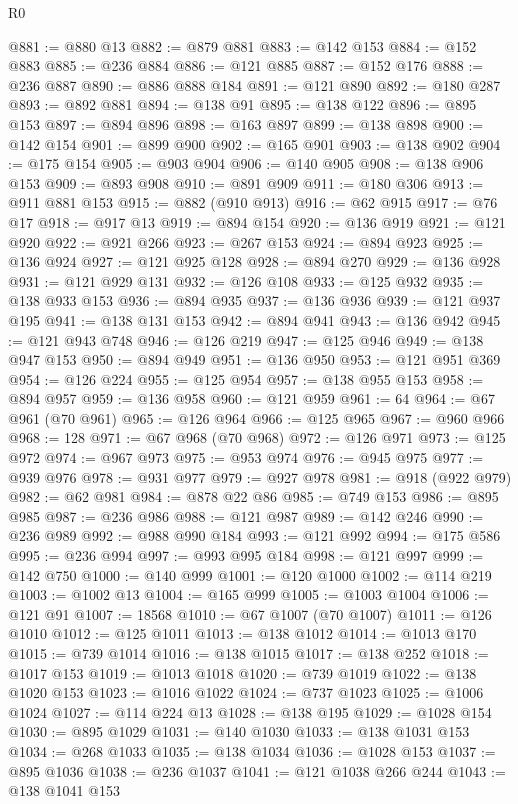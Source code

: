 \begin{lexlean}{R0}
\begin{coremodule}
@881 := @880 @13
@882 := @879 @881
@883 := @142 @153
@884 := @152 @883
@885 := @236 @884
@886 := @121 @885
@887 := @152 @176
@888 := @236 @887
@890 := @886 @888 @184
@891 := @121 @890
@892 := @180 @287
@893 := @892 @881
@894 := @138 @91
@895 := @138 @122
@896 := @895 @153
@897 := @894 @896
@898 := @163 @897
@899 := @138 @898
@900 := @142 @154
@901 := @899 @900
@902 := @165 @901
@903 := @138 @902
@904 := @175 @154
@905 := @903 @904
@906 := @140 @905
@908 := @138 @906 @153
@909 := @893 @908
@910 := @891 @909
@911 := @180 @306
@913 := @911 @881 @153
@915 := @882 (@910 @913)
@916 := @62 @915
@917 := @76 @17
@918 := @917 @13
@919 := @894 @154
@920 := @136 @919
@921 := @121 @920
@922 := @921 @266
@923 := @267 @153
@924 := @894 @923
@925 := @136 @924
@927 := @121 @925 @128
@928 := @894 @270
@929 := @136 @928
@931 := @121 @929 @131
@932 := @126 @108
@933 := @125 @932
@935 := @138 @933 @153
@936 := @894 @935
@937 := @136 @936
@939 := @121 @937 @195
@941 := @138 @131 @153
@942 := @894 @941
@943 := @136 @942
@945 := @121 @943 @748
@946 := @126 @219
@947 := @125 @946
@949 := @138 @947 @153
@950 := @894 @949
@951 := @136 @950
@953 := @121 @951 @369
@954 := @126 @224
@955 := @125 @954
@957 := @138 @955 @153
@958 := @894 @957
@959 := @136 @958
@960 := @121 @959
@961 := 64
@964 := @67 @961 (@70 @961)
@965 := @126 @964
@966 := @125 @965
@967 := @960 @966
@968 := 128
@971 := @67 @968 (@70 @968)
@972 := @126 @971
@973 := @125 @972
@974 := @967 @973
@975 := @953 @974
@976 := @945 @975
@977 := @939 @976
@978 := @931 @977
@979 := @927 @978
@981 := @918 (@922 @979)
@982 := @62 @981
@984 := @878 @22 @86
@985 := @749 @153
@986 := @895 @985
@987 := @236 @986
@988 := @121 @987
@989 := @142 @246
@990 := @236 @989
@992 := @988 @990 @184
@993 := @121 @992
@994 := @175 @586
@995 := @236 @994
@997 := @993 @995 @184
@998 := @121 @997
@999 := @142 @750
@1000 := @140 @999
@1001 := @120 @1000
@1002 := @114 @219
@1003 := @1002 @13
@1004 := @165 @999
@1005 := @1003 @1004
@1006 := @121 @91
@1007 := 18568
@1010 := @67 @1007 (@70 @1007)
@1011 := @126 @1010
@1012 := @125 @1011
@1013 := @138 @1012
@1014 := @1013 @170
@1015 := @739 @1014
@1016 := @138 @1015
@1017 := @138 @252
@1018 := @1017 @153
@1019 := @1013 @1018
@1020 := @739 @1019
@1022 := @138 @1020 @153
@1023 := @1016 @1022
@1024 := @737 @1023
@1025 := @1006 @1024
@1027 := @114 @224 @13
@1028 := @138 @195
@1029 := @1028 @154
@1030 := @895 @1029
@1031 := @140 @1030
@1033 := @138 @1031 @153
@1034 := @268 @1033
@1035 := @138 @1034
@1036 := @1028 @153
@1037 := @895 @1036
@1038 := @236 @1037
@1041 := @121 @1038 @266 @244
@1043 := @138 @1041 @153

\end{coremodule}
\end{lexlean}
